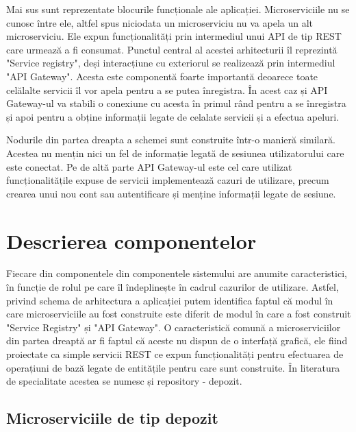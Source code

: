 \documentclass[12pt, a4paper, oneside, romanian]{teza-upb}
\begin{document}
Mai sus sunt reprezentate blocurile funcționale ale aplicației. Microserviciile nu se cunosc între ele, altfel spus niciodata un microserviciu nu va apela un alt microserviciu. Ele expun funcționalități prin intermediul unui API de tip REST care urmează a fi consumat. Punctul central al acestei arhitecturii îl reprezintă "Service registry", deși interacțiune cu exteriorul se realizează prin intermediul "API Gateway". Acesta este componentă foarte importantă deoarece toate celălalte servicii îl vor apela pentru a se putea înregistra. În acest caz și API Gateway-ul va stabili o conexiune cu acesta în primul rând pentru a se înregistra și apoi pentru a obține informații legate de celalate servicii și a efectua apeluri.

Nodurile din partea dreapta a schemei sunt construite într-o manieră similară. Acestea nu mențin nici un fel de informație legată de sesiunea utilizatorului care este conectat. Pe de altă parte API Gateway-ul este cel care utilizat funcționalitățile expuse de servicii implementează cazuri de utilizare, precum crearea unui nou cont sau autentificare și menține informații legate de sesiune. 

\section{Descrierea componentelor}

Fiecare din componentele din componentele sistemului are anumite caracteristici, în funcție de rolul pe care îl îndeplinește în cadrul cazurilor de utilizare. Astfel, privind schema de arhitectura a aplicației putem identifica faptul că modul în care microserviciile au fost construite este diferit de modul în care a fost construit "Service Registry" și "API Gateway".  O caracteristică comună a microserviciilor din partea dreaptă ar fi faptul că aceste nu dispun de o interfață grafică, ele fiind proiectate ca simple servicii REST ce expun funcționalități pentru efectuarea de operațiuni de bază legate de entitățile pentru care sunt construite. În literatura de specialitate acestea se numesc și repository - depozit.

\newpage
\subsection{Microserviciile de tip depozit}
\end{document}
